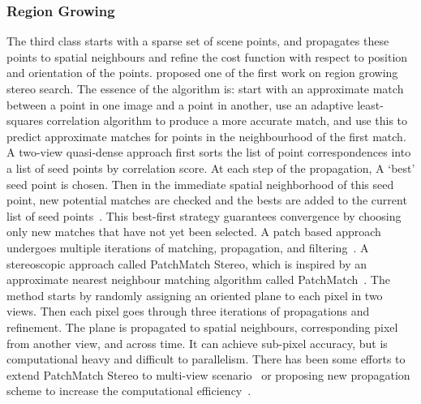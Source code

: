 \subsubsection{Region Growing}
The third class starts with a sparse set of scene points, and propagates these points to spatial neighbours and refine the cost function with respect to position and orientation of the points. \citeauthor{otto1989region} proposed one of the first work on region growing stereo search. The essence of the algorithm is: start with an approximate match between a point in one image and a point in another, use an adaptive least-squares correlation algorithm to produce a more accurate match, and use this to predict approximate matches for points in the neighbourhood of the first match. A two-view quasi-dense approach first sorts the list of point correspondences into a list of seed points by correlation score. At each step of the propagation, A `best' seed point is chosen. Then in the immediate spatial neighborhood of this seed point, new potential matches are checked and the bests are added to the current list of seed points~\cite{lhuillier2002match,lhuillier2005quasi}. This best-first strategy guarantees convergence by choosing only new matches that have not yet been selected. A patch based approach undergoes multiple iterations of matching, propagation, and filtering~\cite{furukawa2010accurate}. A stereoscopic approach called PatchMatch Stereo, which is inspired by an approximate nearest neighbour matching algorithm called PatchMatch~\cite{Barnes:2009:PAR}. The method starts by randomly assigning an oriented plane to each pixel in two views. Then each pixel goes through three iterations of propagations and refinement. The plane is propagated to spatial neighbours, corresponding pixel from another view, and across time. It can achieve sub-pixel accuracy, but is computational heavy and difficult to parallelism. There has been some efforts to extend PatchMatch Stereo to multi-view scenario~\cite{galliani2015massively,uh2014efficient,zheng2014patchmatch} or proposing new propagation scheme to increase the computational efficiency~\cite{galliani2015massively}.

